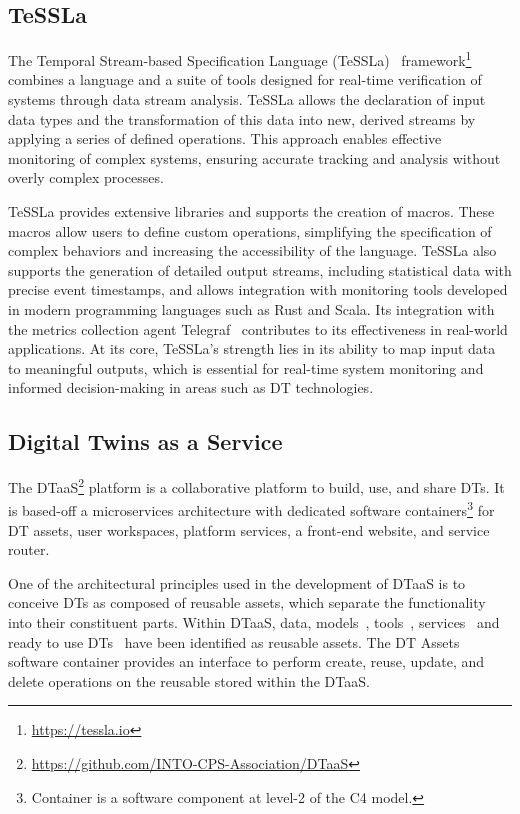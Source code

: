 \subsection{TeSSLa}
The Temporal Stream-based Specification Language (TeSSLa)~\cite{convent2018tessla} framework\footnote{\url{https://tessla.io}} combines a language and a suite of tools designed for real-time verification of systems through data stream analysis. TeSSLa allows the declaration of input data types and the transformation of this data into new, derived streams by applying a series of defined operations. This approach enables effective monitoring of complex systems, ensuring accurate tracking and analysis without overly complex processes.

TeSSLa provides extensive libraries and supports the creation of macros. These macros allow users to define custom operations, simplifying the specification of complex behaviors and increasing the accessibility of the language. TeSSLa also supports the generation of detailed output streams, including statistical data with precise event timestamps, and allows integration with monitoring tools developed in modern programming languages such as Rust and Scala. Its integration with the metrics collection agent Telegraf~\cite{TT-Connector} contributes to its effectiveness in real-world applications.
At its core, TeSSLa's strength lies in its ability to map input data to meaningful outputs, which is essential for real-time system monitoring and informed decision-making in areas such as DT technologies.

\subsection{Digital Twins as a Service}
The DTaaS\footnote{\url{https://github.com/INTO-CPS-Association/DTaaS}} platform is a collaborative platform to build, use, and share DTs.
It is based-off a microservices architecture with dedicated software containers\footnote{Container is a software component at level-2 of the C4 model.} for DT assets, user workspaces, platform services, a front-end website, and service router.

One of the architectural principles used in the development of DTaaS is to conceive DTs as composed of reusable assets, which separate the functionality into their constituent parts.
Within DTaaS, data, models~\cite{Zambrano&22}, tools~\cite{qi2021enabling}, services~\cite{robles2023opentwins} and ready to use DTs~\cite{aziz2023distributed} have been identified as reusable assets.
The DT Assets software container provides an interface to perform create, reuse, update, and delete operations on the reusable stored within the DTaaS.

